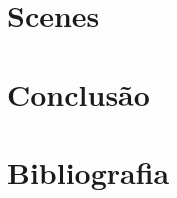 \documentclass[a4paper]{article}
\begin{document}
\section{Scenes}
\label{sec:scenes}


\section{Conclusão}
\label{sec:conclusao}


\section{Bibliografia}
\label{sec:bibliografia}
\end{document}
